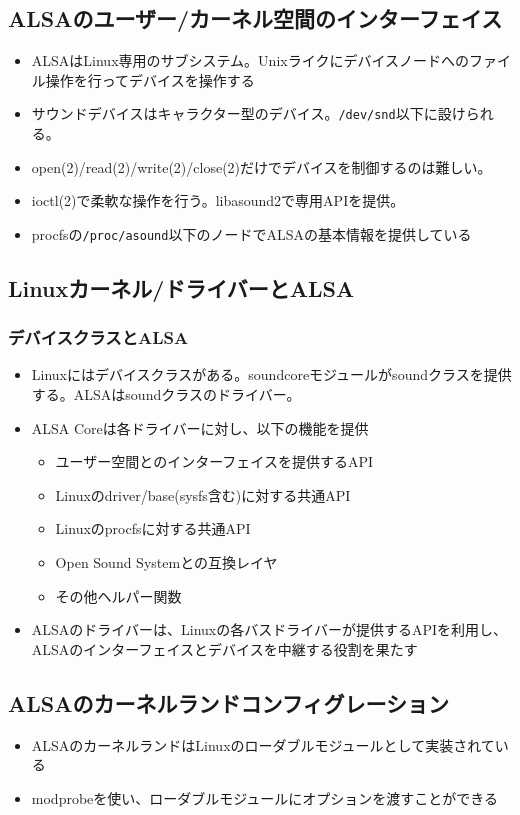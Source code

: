 \documentclass[mingoth,a4paper]{jsarticle}
\begin{document}
\subsection{ALSAのユーザー/カーネル空間のインターフェイス}
\begin{itemize}
\item ALSAはLinux専用のサブシステム。Unixライクにデバイスノードへのファイル操作を行ってデバイスを操作する
\item サウンドデバイスはキャラクター型のデバイス。\texttt{/dev/snd}以下に設けられる。
\item open(2)/read(2)/write(2)/close(2)だけでデバイスを制御するのは難しい。
\item ioctl(2)で柔軟な操作を行う。libasound2で専用APIを提供。
\item procfsの\texttt{/proc/asound}以下のノードでALSAの基本情報を提供している
\end{itemize}

\subsection{Linuxカーネル/ドライバーとALSA}
\subsubsection{デバイスクラスとALSA}
\begin{itemize}
\item Linuxにはデバイスクラスがある。soundcoreモジュールがsoundクラスを提供する。ALSAはsoundクラスのドライバー。
\item ALSA Coreは各ドライバーに対し、以下の機能を提供
  \begin{itemize}
  \item ユーザー空間とのインターフェイスを提供するAPI
  \item Linuxのdriver/base(sysfs含む)に対する共通API
  \item Linuxのprocfsに対する共通API
  \item Open Sound Systemとの互換レイヤ
  \item その他ヘルパー関数
  \end{itemize}
\item ALSAのドライバーは、Linuxの各バスドライバーが提供するAPIを利用し、ALSAのインターフェイスとデバイスを中継する役割を果たす
\end{itemize}

\subsection{ALSAのカーネルランドコンフィグレーション}
\begin{itemize}
\item ALSAのカーネルランドはLinuxのローダブルモジュールとして実装されている
\item modprobeを使い、ローダブルモジュールにオプションを渡すことができる
\end{itemize}
\end{document}
